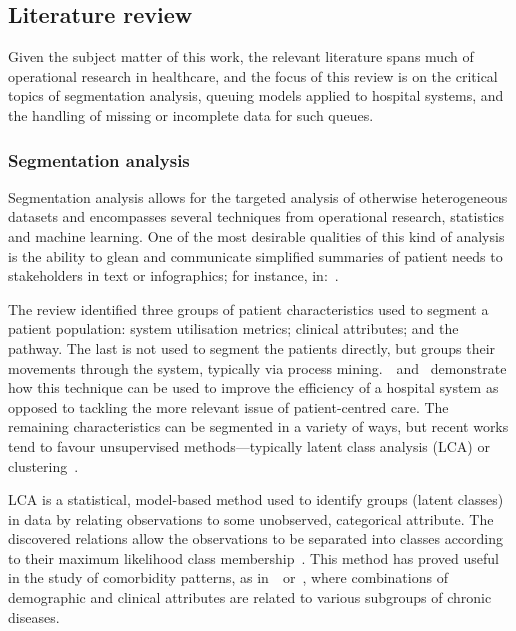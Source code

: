 \documentclass[]{interact}
\theoremstyle{plain}%
\theoremstyle{definition}
\theoremstyle{remark}
\begin{document}
\subsection{Literature review}\label{subsec:review}

Given the subject matter of this work, the relevant literature spans much of
operational research in healthcare, and the focus of this review is on the
critical topics of segmentation analysis, queuing models applied to hospital
systems, and the handling of missing or incomplete data for such queues.

\subsubsection{Segmentation analysis}

Segmentation analysis allows for the targeted analysis of otherwise
heterogeneous datasets and encompasses several techniques from operational
research, statistics and machine learning. One of the most desirable qualities
of this kind of analysis is the ability to glean and communicate simplified
summaries of patient needs to stakeholders in text or infographics; for
instance, in:~\citep{Vuik2016a,Vuik2016b,Yan2019,Yoon2020}.

The review identified three groups of patient characteristics used to segment a
patient population: system utilisation metrics; clinical attributes; and the
pathway. The last is not used to segment the patients directly, but groups their
movements through the system, typically via process
mining.~\cite{Arnolds2018}~and~\cite{Delias2015} demonstrate how this technique
can be used to improve the efficiency of a hospital system as opposed to
tackling the more relevant issue of patient-centred care. The remaining
characteristics can be segmented in a variety of ways, but recent works tend to
favour unsupervised methods---typically latent class analysis (LCA) or
clustering~\citep{Yan2018}.

LCA is a statistical, model-based method used to identify groups (latent
classes) in data by relating observations to some unobserved, categorical
attribute. The discovered relations allow the observations to be separated into
classes according to their maximum likelihood class
membership~\citep{Hagenaars2002,Lazarsfeld1968}. This method has proved useful
in the study of comorbidity patterns, as
in~\cite{Kuwornu2014}~or~\cite{Larsen2017}, where combinations of demographic
and clinical attributes are related to various subgroups of chronic diseases.
\end{document}
